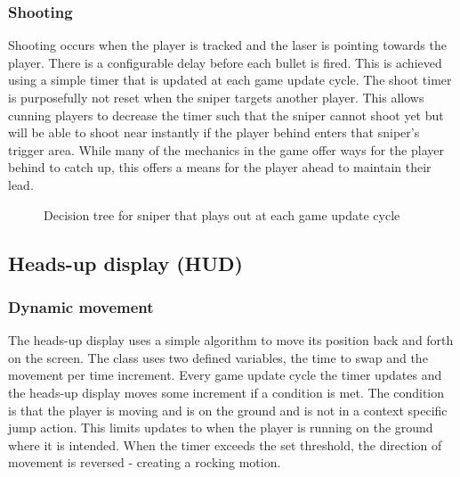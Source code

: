 \documentclass[11pt,a4paper]{article}
\begin{document}
\subsubsection{Shooting}
Shooting occurs when the player is tracked and the laser is pointing towards the player. There is a configurable delay before each bullet is fired. This is achieved using a simple timer that is updated at each game update cycle. The shoot timer is purposefully not reset when the sniper targets another player. This allows cunning players to decrease the timer such that the sniper cannot shoot yet but will be able to shoot near instantly if the player behind enters that sniper's trigger area. While many of the mechanics in the game offer ways for the player behind to catch up, this offers a means for the player ahead to maintain their lead.
\begin{figure}[H]
    \caption{Decision tree for sniper that plays out at each game update cycle}
    \label{fig:sniperDecisionTree}
\end{figure}
\subsection{Heads-up display (HUD)}
\subsubsection{Dynamic movement}
\label{sss:dynamic_movement}
The heads-up display uses a simple algorithm to move its position back and forth on the screen. The class uses two defined variables, the time to swap and the movement per time increment. Every game update cycle the timer updates and the heads-up display moves some increment if a condition is met. The condition is that the player is moving and is on the ground and is not in a context specific jump action. This limits updates to when the player is running on the ground where it is intended. When the timer exceeds the set threshold, the direction of movement is reversed - creating a rocking motion.
\end{document}
